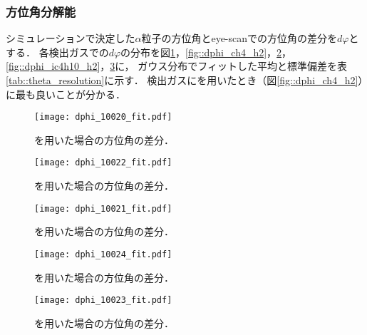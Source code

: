\documentclass[../master]{subfiles}
\begin{document}
\subsubsection{方位角分解能}
シミュレーションで決定した$\alpha$粒子の方位角とeye-scanでの方位角の差分を$d\varphi$とする．
各検出ガスでの$d\varphi$の分布を図\ref{fig::dphi_ch4}，\ref{fig::dphi_ch4_h2}，\ref{fig::dphi_ch4_he}，
\ref{fig::dphi_ic4h10_h2}，\ref{fig::dphi_ic4h10_he}に，
ガウス分布でフィットした平均と標準偏差を表\ref{tab::theta_resolution}に示す．
検出ガスに\MethaneHydro を用いたとき（図\ref{fig::dphi_ch4_h2}）に最も良いことが分かる．
\begin{figure}
  \centering
  \begin{minipage}{0.45\columnwidth}
    \centering
    \texttt{[image: dphi\_10020\_fit.pdf]}
    \caption{\Methane を用いた場合の方位角の差分．}
    \label{fig::dphi_ch4}
  \end{minipage}
\end{figure}
\begin{figure}
  \centering
  \begin{minipage}{0.45\columnwidth}
    \centering
    \texttt{[image: dphi\_10022\_fit.pdf]}
    \caption{\MethaneHydro を用いた場合の方位角の差分．}
    \label{fig::dphi_ch4_h2}
  \end{minipage}
  \begin{minipage}{0.45\columnwidth}
    \centering
    \texttt{[image: dphi\_10021\_fit.pdf]}
    \caption{\MethaneHerium を用いた場合の方位角の差分．}
    \label{fig::dphi_ch4_he}
  \end{minipage}
\end{figure}
\begin{figure}
  \centering
  \begin{minipage}{0.45\columnwidth}
    \centering
    \texttt{[image: dphi\_10024\_fit.pdf]}
    \caption{\isoButaneHydro を用いた場合の方位角の差分．}
    \label{fig::dphi_ic4h10_h2}
  \end{minipage}
  \begin{minipage}{0.45\columnwidth}
    \centering
    \texttt{[image: dphi\_10023\_fit.pdf]}
    \caption{\isoButaneHerium を用いた場合の方位角の差分．}
    \label{fig::dphi_ic4h10_he}
  \end{minipage}
\end{figure}
\end{document}
